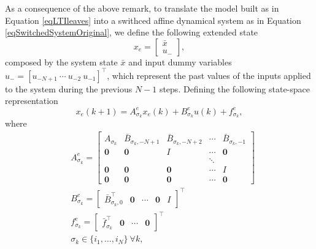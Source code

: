 \documentclass[]{ifacconf}  %
\begin{document}
As a consequence of the above remark, to translate the model built as in Equation \eqref{eqLTIleaves} into a swithced affine dynamical system as in Equation \eqref{eqSwitchedSystemOriginal}, we define the following extended state
\small
\begin{equation}\label{eqExtendedStateSpace}
x_e=\left[\begin{array}{l}
\bar x \\
u_{-}
\end{array}\right],
\end{equation}
\normalsize
composed by the system state $\bar x$ and input dummy variables $u_- = [u_{-N+1}\ \cdots\ u_{-2}\ u_{-1}]^\top$, which represent the past values of the inputs applied to the system during the previous $N-1$ steps.
Defining the following state-space representation
\small
\begin{equation}\label{eqExtendedSwitchedSystem} 
	x_e(k+1) = A_{\sigma_k}^e x_e(k) + B_{\sigma_k}^e u(k) + f^e_{\sigma_k},	
\end{equation}
\normalsize
where
\small
\begin{align}
&A_{\sigma_k}^e = \left[\begin{array}{ccccc}
							A_{\sigma_k}    & \bar B_{\sigma_k,-N+1} & \bar B_{\sigma_k,-N+2} & \cdots & \bar B_{\sigma_k,-1} \\
							\mathbf{0} & \mathbf{0}      & I            	 & \cdots & \mathbf{0}   \\
									&                 &              	 & \ddots &            \\
							\mathbf{0} & \mathbf{0}      & \mathbf{0}   	 & \cdots & I          \\
							\mathbf{0} & \mathbf{0}      & \mathbf{0}   	 & \cdots & \mathbf{0}   
						\end{array}
				  \right]\label{eqAeij} \\
&B_{\sigma_k}^e = \left[\begin{array}{ccccc}
							\bar B_{\sigma_k,0}^\top  &	\mathbf{0} & \cdots & \mathbf{0} & I  
						\end{array}
				  \right]^\top\label{eqBeij}\\
&f_{\sigma_k}^e = \left[\begin{array}{cccc}
							\bar f_{\sigma_k}^\top  &	\mathbf{0} & \cdots & \mathbf{0}  
						\end{array}
				  \right]^\top\label{eqfeij}\\
&\sigma_k      \in\{i_1,\ldots,i_N\}\ \forall k,
\end{align}
\end{document}

